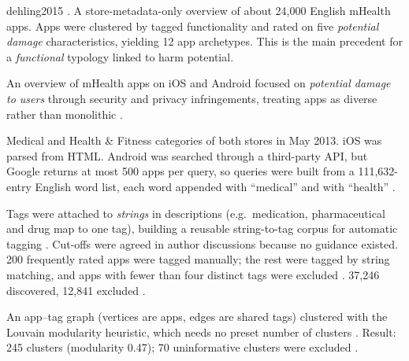 \begin{papercard}{dehling2015}
   . A store-metadata-only overview of about 24{,}000 English mHealth apps. Apps were clustered by tagged functionality and rated on five \emph{potential damage} characteristics, yielding 12 app archetypes. This is the main precedent for a \emph{functional} typology linked to harm potential.

 An overview of mHealth apps on iOS and Android focused on \emph{potential damage to users} through security and privacy infringements, treating apps as diverse rather than monolithic .

 Medical and Health \& Fitness categories of both stores in May 2013. iOS was parsed from HTML. Android was searched through a third-party API, but Google returns at most 500 apps per query, so queries were built from a 111{,}632-entry English word list, each word appended with ``medical'' and with ``health'' .

 Tags were attached to \emph{strings} in descriptions (e.g.\ medication, pharmaceutical and drug map to one tag), building a reusable string-to-tag corpus for automatic tagging . Cut-offs were agreed in author discussions because no guidance existed. 200 frequently rated apps were tagged manually; the rest were tagged by string matching, and apps with fewer than four distinct tags were excluded . 37{,}246 discovered, 12{,}841 excluded .

 An app--tag graph (vertices are apps, edges are shared tags) clustered with the Louvain modularity heuristic, which needs no preset number of clusters . Result: 245 clusters (modularity 0.47); 70 uninformative clusters were excluded .


\end{papercard}
